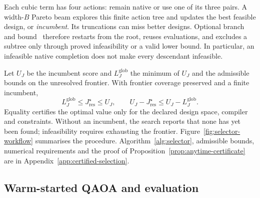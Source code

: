 \documentclass[a4paper,onecolumn,11pt,unpublished]{quantumarticle}
\theoremstyle{remark}
\begin{document}
Each cubic term has four actions: remain native or use one of its three
pairs. A width-$B$ Pareto beam explores this finite action tree and updates
the best feasible design, or \emph{incumbent}. Its truncations can miss better
designs. Optional branch and bound~\cite{LandDoig1960,LawlerWood1966}
therefore restarts from the root, reuses
evaluations, and excludes a subtree only through proved infeasibility or a
valid lower bound. In particular, an infeasible native completion does not
make every descendant infeasible.

Let $U_J$ be the incumbent score and $L_J^{\mathrm{glob}}$ the minimum of
$U_J$ and the admissible bounds on the unresolved frontier. With frontier
coverage preserved and a finite incumbent,
\begin{equation}
L_J^{\mathrm{glob}}\leq J_{\mathrm{res}}^\star\leq U_J,
\qquad U_J-J_{\mathrm{res}}^\star\leq U_J-L_J^{\mathrm{glob}}.
\label{eq:anytime-certificate}
\end{equation}
Equality certifies the optimal value only for the declared design space,
compiler and constraints. Without an incumbent, the search reports that
none has yet been found; infeasibility requires exhausting the frontier.
Figure~\ref{fig:selector-workflow} summarises the procedure.
Algorithm~\ref{alg:selector}, admissible bounds, numerical requirements and
the proof of Proposition~\ref{prop:anytime-certificate} are in
Appendix~\ref{app:certified-selection}.

\subsection{Warm-started QAOA and evaluation}
\label{sec:warm-start}
\label{sec:warm-start-state}
\label{sec:ws-qaoa}
\label{sec:cost-consistency}
\end{document}
